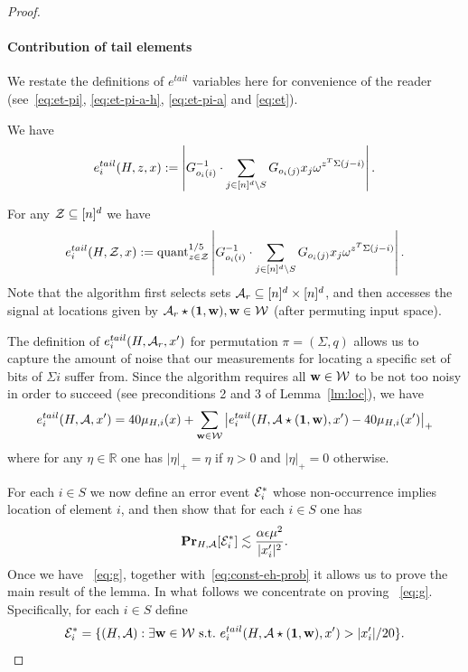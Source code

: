 \begin{proof}
\paragraph{Contribution of tail elements}
We restate the definitions of $e^{tail}$ variables here for convenience of the reader (see~\eqref{eq:et-pi}, \eqref{eq:et-pi-a-h}, \eqref{eq:et-pi-a} and \eqref{eq:et}). 

We have
\begin{equation*}
e^{tail}_i(H, z, x):=\left|G_{o_i(i)}^{-1}\cdot \sum_{j\in {[n]^d}\setminus S} G_{o_i(j)}x_j \omega^{z^T \Sigma (j-i)}\right|.
\end{equation*}

For any $\mathcal{Z}\subseteq {[n]^d}$ we have
\begin{equation*}
e^{tail}_i(H, \mathcal{Z}, x):=\text{quant}^{1/5}_{z\in \mathcal{Z}} \left|G_{o_i(i)}^{-1}\cdot \sum_{j\in {[n]^d}\setminus S} G_{o_i(j)}x_j \omega^{z^T \Sigma (j-i)}\right|.
\end{equation*}
Note that the algorithm first selects sets ${\mathcal{A}}_r\subseteq {[n]^d}\times {[n]^d}$, and then accesses the signal at locations given by ${\mathcal{A}}_r\star (\mathbf{1}, \mathbf{w}), \mathbf{w}\in \mathcal{W}$ (after permuting input space).

The definition of $e^{tail}_i(H, {\mathcal{A}}_r, x')$ for permutation $\pi=(\Sigma, q)$ allows us to capture the amount of noise that our measurements for locating a specific set of bits of $\Sigma i$ suffer from. Since the algorithm requires all $\mathbf{w}\in \mathcal{W}$ to be not too noisy in order to succeed (see preconditions 2 and 3 of Lemma~\ref{lm:loc}), we have
\begin{equation*}
e^{tail}_i(H, {\mathcal{A}}, x')=40\mu_{H, i}(x)+\sum_{\mathbf{w}\in \mathcal{W}} \left|e^{tail}_i(H, {\mathcal{A}}\star (\mathbf{1}, \mathbf{w}), x')-40\mu_{H, i}(x')\right|_+
\end{equation*}
where for any $\eta\in \mathbb{R}$ one has $|\eta|_+=\eta$ if $\eta>0$ and $|\eta|_+=0$ otherwise. 


For each $i\in S$ we now define an error event ${\mathcal{E}}^*_i$ whose non-occurrence implies location of element $i$, and then show that for each $i\in S$ one has
\begin{equation}\label{eq:g}
{\bf \mbox{\bf Pr}}_{H, {\mathcal{A}}}[{\mathcal{E}}^*_i]\lesssim \frac{\alpha {\epsilon} \mu^2}{|x'_i|^2}.
\end{equation}
Once we have ~\eqref{eq:g}, together with~\eqref{eq:const-eh-prob} it allows us to prove the main result of the lemma. In what follows we concentrate on proving 
~\eqref{eq:g}. Specifically, for each $i\in S$ define
\begin{equation*}
{\mathcal{E}}^*_i=\{(H, {\mathcal{A}}): \exists \mathbf{w}\in \mathcal{W} \text{~s.t.~} e^{tail}_i(H,{\mathcal{A}}\star (\mathbf{1}, \mathbf{w}), x')>|x'_i|/20\}.
\end{equation*}



\end{proof}
